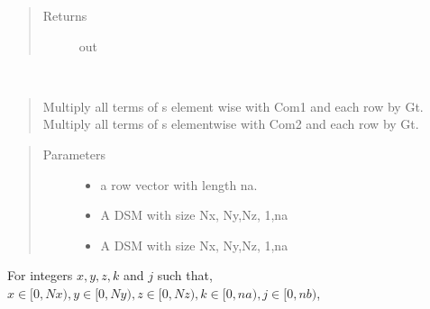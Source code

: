 \documentclass[letterpaper,10pt,english]{sphinxmanual}
\begin{document}
\begin{fulllineitems}
\begin{fulllineitems}
\begin{quote}
\begin{description}
\item[{Returns}] \leavevmode
out

\end{description}\end{quote}

\end{fulllineitems}


\begin{fulllineitems}
\label{\detokenize{index:DictionarySparseMatrix.DS.gain_phase_ref_mul}}~\begin{quote}

Multiply all terms of s element wise with Com1 and each row by Gt.
Multiply all terms of s elementwise with Com2 and each row by Gt.
\end{quote}
\begin{quote}\begin{description}
\item[{Parameters}] \leavevmode\begin{itemize}
\item {} 
 \textendash{} a row vector with length na.

\item {} 
 \textendash{} A DSM with size Nx, Ny,Nz, 1,na

\item {} 
 \textendash{} A DSM with size Nx, Ny,Nz, 1,na

\end{itemize}

\end{description}\end{quote}

For integers \(x,y,z,k\) and \(j\) such that,
\(x \in [0,Nx), y \in [0,Ny), z \in [0,Nz), k \in [0,na),j \in [0,nb)\),


\end{fulllineitems}
\end{fulllineitems}
\end{document}
